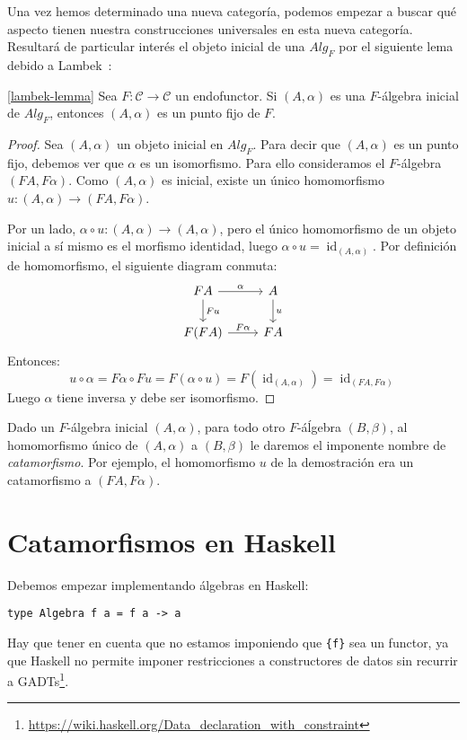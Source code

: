 \documentclass[12pt, twoside]{book}
\newcommand{\newterm}[1]{\index{#1}\emph{#1}}
\newcommand{\code}[1]{\Verb+{#1}+}
\newcommand{\cat}{{\mathcal{C}}}
\DeclareMathOperator{\id}{id}
\begin{document}
Una vez hemos determinado una nueva categoría, podemos empezar a buscar qué aspecto tienen nuestra construcciones universales en esta nueva categoría.
Resultará de particular interés el objeto inicial de una $Alg_F$ por el siguiente lema debido a Lambek~\cite{lambek}:

\begin{lemma}\ref{lambek-lemma}
Sea $F \colon \cat \to \cat$ un endofunctor.
Si $(A,\alpha)$ es una $F$-álgebra inicial de $Alg_F$, entonces $(A,\alpha)$ es un punto fijo de $F$.
\end{lemma}
\begin{proof}
Sea $(A,\alpha)$ un objeto inicial en $Alg_F$.
Para decir que $(A,\alpha)$ es un punto fijo, debemos ver que $\alpha$ es un isomorfismo.
Para ello consideramos el $F$-álgebra $(F A, F \alpha)$.
Como $(A,\alpha)$ es inicial, existe un único homomorfismo $u \colon (A, \alpha) \to (F A, F \alpha)$.

Por un lado, $\alpha \circ u \colon (A, \alpha) \to (A, \alpha)$, pero el único homomorfismo de un objeto inicial a sí mismo es el morfismo identidad, luego $\alpha \circ u = \id_{(A, \alpha)}$.
Por definición de homomorfismo, el siguiente diagram conmuta:
\[
\begin{tikzcd}
F A \arrow[r,"\alpha"] \arrow[d,"F u"] & A \arrow[d,"u"]\\
F (F A) \arrow[r,"F \alpha"] & F A
\end{tikzcd}
\]
Entonces:
\[ u \circ \alpha = F \alpha \circ F u = F (\alpha \circ u) = F (\id_{(A, \alpha)}) = \id_{(F A, F \alpha)} \]
Luego $\alpha$ tiene inversa y debe ser isomorfismo.
\end{proof}

Dado un $F$-álgebra inicial $(A,\alpha)$, para todo otro $F$-áĺgebra $(B,\beta)$, al homomorfismo único de $(A,\alpha)$ a $(B,\beta)$ le daremos el imponente nombre de \newterm{catamorfismo}.
Por ejemplo, el homomorfismo $u$ de la demostración era un catamorfismo a $(F A, F \alpha)$.

\section{Catamorfismos en Haskell}

Debemos empezar implementando álgebras en Haskell:
\begin{verbatim}
type Algebra f a = f a -> a
\end{verbatim}
Hay que tener en cuenta que no estamos imponiendo que \code{f} sea un functor, ya que Haskell no permite imponer restricciones a constructores de datos sin recurrir a GADTs\footnote{\url{https://wiki.haskell.org/Data_declaration_with_constraint}}.
\end{document}
